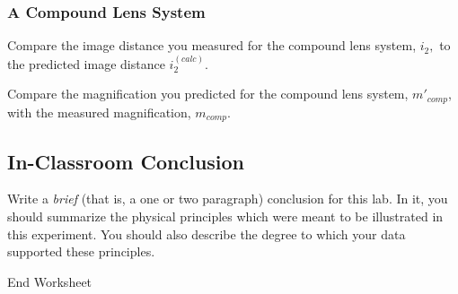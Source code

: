 \subsubsection{A Compound Lens System}  


\noindent
Compare the image distance you measured for the compound lens system,
$i_2,$ to the predicted image distance $i_2^{(calc)}.$ \\
\vspace*{4cm} 

\noindent
Compare the magnification you predicted  for the compound lens system,
$m'_{comp}$, with the measured magnification, $m_{comp}$. \\

\newpage
\subsection{In-Classroom Conclusion}

Write a {\it brief} (that is, a one or two paragraph) conclusion for
this lab. In it, you should summarize the physical
principles which were meant to be illustrated in this experiment. You
should also describe the degree to which your data supported these
principles.



\vfill
{\Large End Worksheet} 
\renewcommand{\thesection}{\thechapter.\arabic{section}}


















